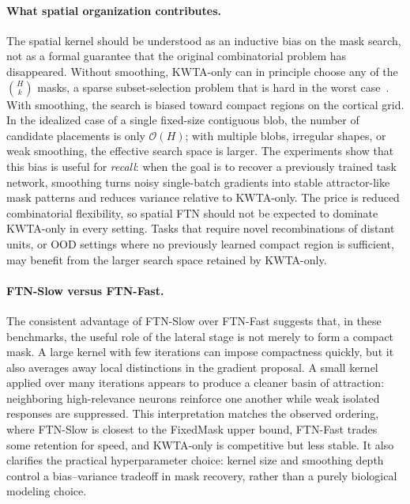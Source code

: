 \documentclass{article}
\begin{document}
\paragraph{What spatial organization contributes.}
The spatial kernel should be understood as an inductive bias on the mask search, not as a formal guarantee that the original combinatorial problem has disappeared. Without smoothing, KWTA-only can in principle choose any of the $\binom{H}{k}$ masks, a sparse subset-selection problem that is hard in the worst case~\citep{natarajan1995sparse}. With smoothing, the search is biased toward compact regions on the cortical grid. In the idealized case of a single fixed-size contiguous blob, the number of candidate placements is only $\mathcal{O}(H)$; with multiple blobs, irregular shapes, or weak smoothing, the effective search space is larger. The experiments show that this bias is useful for \emph{recall}: when the goal is to recover a previously trained task network, smoothing turns noisy single-batch gradients into stable attractor-like mask patterns and reduces variance relative to KWTA-only. The price is reduced combinatorial flexibility, so spatial FTN should not be expected to dominate KWTA-only in every setting. Tasks that require novel recombinations of distant units, or OOD settings where no previously learned compact region is sufficient, may benefit from the larger search space retained by KWTA-only.

\paragraph{FTN-Slow versus FTN-Fast.}
The consistent advantage of FTN-Slow over FTN-Fast suggests that, in these benchmarks, the useful role of the lateral stage is not merely to form a compact mask. A large kernel with few iterations can impose compactness quickly, but it also averages away local distinctions in the gradient proposal. A small kernel applied over many iterations appears to produce a cleaner basin of attraction: neighboring high-relevance neurons reinforce one another while weak isolated responses are suppressed. This interpretation matches the observed ordering, where FTN-Slow is closest to the FixedMask upper bound, FTN-Fast trades some retention for speed, and KWTA-only is competitive but less stable. It also clarifies the practical hyperparameter choice: kernel size and smoothing depth control a bias--variance tradeoff in mask recovery, rather than a purely biological modeling choice.
\end{document}
